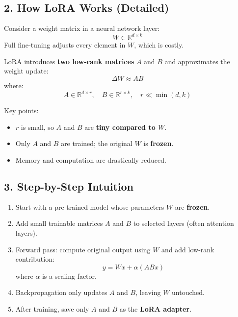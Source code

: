 \documentclass[a4paper, 12pt]{article}
\begin{document}
\subsection*{2. How LoRA Works (Detailed)}
Consider a weight matrix in a neural network layer:  
\[
W \in \mathbb{R}^{d \times k}
\]
Full fine-tuning adjusts every element in $W$, which is costly.  

LoRA introduces \textbf{two low-rank matrices} $A$ and $B$ and approximates the weight update:
\[
\Delta W \approx A B
\]
where:
\[
A \in \mathbb{R}^{d \times r}, \quad B \in \mathbb{R}^{r \times k}, \quad r \ll \min(d, k)
\]

Key points:  
\begin{itemize}
    \item $r$ is small, so $A$ and $B$ are \textbf{tiny compared to $W$}.
    \item Only $A$ and $B$ are trained; the original $W$ is \textbf{frozen}.
    \item Memory and computation are drastically reduced.
\end{itemize}

\subsection*{3. Step-by-Step Intuition}
\begin{enumerate}
    \item Start with a pre-trained model whose parameters $W$ are \textbf{frozen}.
    \item Add small trainable matrices $A$ and $B$ to selected layers (often attention layers).
    \item Forward pass: compute original output using $W$ and add low-rank contribution:  
    \[
    y = W x + \alpha (A B x)
    \]
    where $\alpha$ is a scaling factor.
    \item Backpropagation only updates $A$ and $B$, leaving $W$ untouched.
    \item After training, save only $A$ and $B$ as the \textbf{LoRA adapter}.
\end{enumerate}
\end{document}
